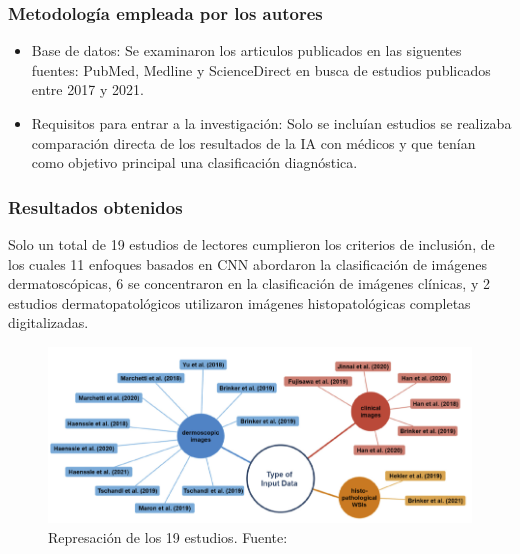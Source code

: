\subsubsection{Metodología empleada por los autores}
\newcommand{\TISCone}{Base de datos: Se examinaron los articulos publicados en las siguentes fuentes: PubMed, Medline y ScienceDirect en busca de estudios publicados entre 2017 y 2021.
	
}
\newcommand{\TISCtwo}{Requisitos para entrar a la investigación: Solo se incluían estudios se realizaba comparación directa de los resultados de la IA con médicos y que tenían como objetivo principal una clasificación diagnóstica.
}


\begin{itemize}
	\item \TISCone
	\item \TISCtwo
	
\end{itemize}

\subsubsection{Resultados obtenidos}
Solo un total de 19 estudios de lectores cumplieron los criterios de inclusión, de los cuales 11 enfoques basados en CNN abordaron la clasificación de imágenes dermatoscópicas, 6 se concentraron en la clasificación de imágenes clínicas, y 2 estudios dermatopatológicos utilizaron imágenes histopatológicas completas digitalizadas.



\begin{figure}[h]
	\begin{center}
		\includegraphics[width=1\textwidth]{2/figuras/Skin_cancer_classification _imagen_01.png}
		\caption{Represación de los 19 estudios. Fuente: \cite{haggenmuller2021skin}}
		\label{1:fig 4}
	\end{center}
\end{figure}






